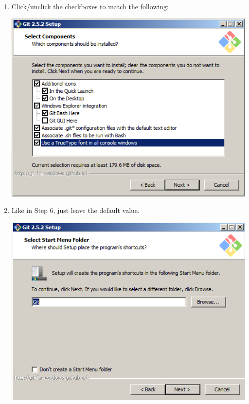 \documentclass[11pt,fleqn]{article}
\theoremstyle{definition}
\begin{document}
\begin{enumerate}[Step 1.]
\item Click/unclick the checkboxes to match the following:
\begin{center}
\includegraphics[scale=0.6]{gitwininstall7.png}
\end{center}

\newpage
\item Like in Step 6, just leave the default value.
\begin{center}
\includegraphics[scale=0.6]{gitwininstall8.png}
\end{center}


\end{enumerate}
\end{document}
